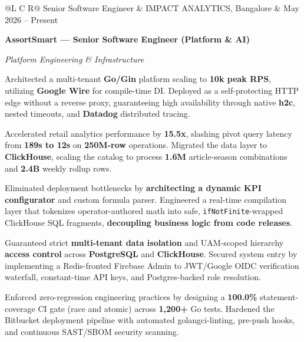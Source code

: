 
\noindent
\begin{tabularx}{\textwidth}{@{}L C R@{}}
\textcolor{role}{Senior Software Engineer} & \textcolor{company}{IMPACT ANALYTICS, Bangalore} & \textcolor{date}{May 2026 -- Present}\\
\end{tabularx}
\vspace{-1.35ex}

\textcolor{Project}{\textbf{AssortSmart --- Senior Software Engineer (Platform \& AI)}}
\vspace{0.25ex}

\textcolor{Project}{\textit{Platform Engineering \& Infrastructure}}
\vspace{-0.65ex}
\begin{zitemize}
    \item Architected a multi-tenant \textbf{Go/Gin} platform scaling to \textbf{10k peak RPS}, utilizing \textbf{Google Wire} for compile-time DI. Deployed as a self-protecting HTTP edge without a reverse proxy, guaranteeing high availability through native \textbf{h2c}, nested timeouts, and \textbf{Datadog} distributed tracing.
    \item Accelerated retail analytics performance by \textbf{15.5x}, slashing pivot query latency from \textbf{189s to 12s} on \textbf{250M-row} operations. Migrated the data layer to \textbf{ClickHouse}, scaling the catalog to process \textbf{1.6M} article-season combinations and \textbf{2.4B} weekly rollup rows.
    \item Eliminated deployment bottlenecks by \textbf{architecting a dynamic KPI configurator} and custom formula parser. Engineered a real-time compilation layer that tokenizes operator-authored math into safe, \texttt{ifNotFinite}-wrapped ClickHouse SQL fragments, \textbf{decoupling business logic from code releases}.
    \item Guaranteed strict \textbf{multi-tenant data isolation} and UAM-scoped hierarchy \textbf{access control} across \textbf{PostgreSQL} and \textbf{ClickHouse}. Secured system entry by implementing a Redis-fronted Firebase Admin to JWT/Google OIDC verification waterfall, constant-time API keys, and Postgres-backed role resolution.
    \item Enforced zero-regression engineering practices by designing a \textbf{100.0\%} statement-coverage CI gate (race and atomic) across \textbf{1,200+} Go tests. Hardened the Bitbucket deployment pipeline with automated golangci-linting, pre-push hooks, and continuous SAST/SBOM security scanning.
\end{zitemize}

